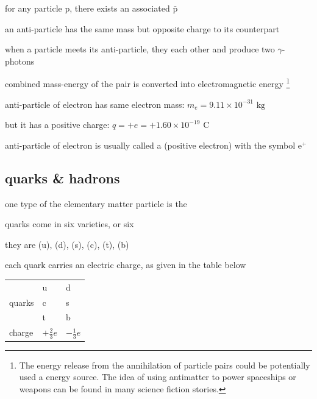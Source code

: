 for any particle $\text{p}$, there exists an associated  $\bar{\text{p}}$

\cmt an anti-particle has the same mass but opposite charge to its counterpart

\cmt when a particle meets its anti-particle, they  each other and produce two $\gamma$-photons

combined mass-energy of the pair is converted into electromagnetic energy
\footnote{The energy release from the annihilation of  particle pairs could be potentially used a energy source. The idea of using antimatter to power spaceships or weapons can be found in many science fiction stories.}




\begin{soln} anti-particle of electron has same electron mass: $m_e = 9.11\times10^{-31} \text{ kg}$

but it has a positive charge: $q = +e = + 1.60\times10^{-19} \text{ C}$

anti-particle of electron is usually called a  (positive electron) with the symbol $\text{e}^+$ \end{soln}


\subsection{quarks \& hadrons}

one type of the elementary matter particle is the 

\cmt quarks come in six varieties, or six 

they are  (u),  (d),  (s),  (c),  (t),  (b)

\cmt each quark carries an electric charge, as given in the table below

\begin{center}
	{\renewcommand{\arraystretch}{1.35}
		\begin{tabular}{|C{3cm}|C{2cm}|C{2cm}|}
			\hline  & u & d \\
			 quarks & c & s \\
			  & t & b \\
			\hline charge & $+\frac{2}{3}e$ & $-\frac{1}{3}e$ \\[3pt]
			\hline
		\end{tabular}
	}
\end{center}

